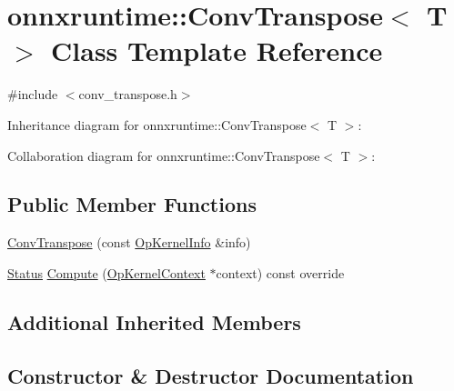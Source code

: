 \hypertarget{classonnxruntime_1_1ConvTranspose}{}\section{onnxruntime\+:\+:Conv\+Transpose$<$ T $>$ Class Template Reference}
\label{classonnxruntime_1_1ConvTranspose}


{\ttfamily \#include $<$conv\+\_\+transpose.\+h$>$}



Inheritance diagram for onnxruntime\+:\+:Conv\+Transpose$<$ T $>$\+:


Collaboration diagram for onnxruntime\+:\+:Conv\+Transpose$<$ T $>$\+:
\subsection*{Public Member Functions}
\begin{DoxyCompactItemize}
\item 
\mbox{\hyperlink{classonnxruntime_1_1ConvTranspose_afec8a7249e1c960a2bbd484af95117c2}{Conv\+Transpose}} (const \mbox{\hyperlink{classonnxruntime_1_1OpKernelInfo}{Op\+Kernel\+Info}} \&info)
\item 
\mbox{\hyperlink{classonnxruntime_1_1common_1_1Status}{Status}} \mbox{\hyperlink{classonnxruntime_1_1ConvTranspose_aaf4f2e7fec38e9f0f1a042e8d05b006e}{Compute}} (\mbox{\hyperlink{classonnxruntime_1_1OpKernelContext}{Op\+Kernel\+Context}} $\ast$context) const override
\end{DoxyCompactItemize}
\subsection*{Additional Inherited Members}


\subsection{Constructor \& Destructor Documentation}
\mbox{\label{classonnxruntime_1_1ConvTranspose_afec8a7249e1c960a2bbd484af95117c2}} 
